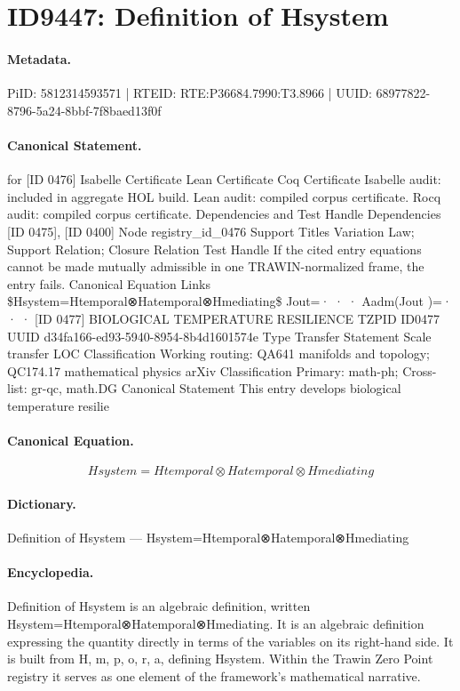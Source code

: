 \section*{ID9447: Definition of Hsystem}
\paragraph{Metadata.}
PiID: 5812314593571 | RTEID: RTE:P36684.7990:T3.8966 | UUID: 68977822-8796-5a24-8bbf-7f8baed13f0f

\paragraph{Canonical Statement.}
for [ID 0476] Isabelle Certificate Lean Certificate Coq Certificate Isabelle audit: included in aggregate HOL build. Lean audit: compiled corpus certificate. Rocq audit: compiled corpus certificate. Dependencies and Test Handle Dependencies [ID 0475], [ID 0400] Node registry\_id\_0476 Support Titles Variation Law; Support Relation; Closure Relation Test Handle If the cited entry equations cannot be made mutually admissible in one TRAWIN-normalized frame, the entry fails. Canonical Equation Links \$Hsystem=Htemporal⊗Hatemporal⊗Hmediating\$ Jout=· · · Aadm(Jout )=· · · [ID 0477] BIOLOGICAL TEMPERATURE RESILIENCE TZPID ID0477 UUID d34fa166-ed93-5940-8954-8b4d1601574e Type Transfer Statement Scale transfer LOC Classification Working routing: QA641 manifolds and topology; QC174.17 mathematical physics arXiv Classification Primary: math-ph; Cross-list: gr-qc, math.DG Canonical Statement This entry develops biological temperature resilie

\paragraph{Canonical Equation.}
\[
Hsystem=Htemporal⊗Hatemporal⊗Hmediating
\]

\paragraph{Dictionary.}
Definition of Hsystem — Hsystem=Htemporal⊗Hatemporal⊗Hmediating

\paragraph{Encyclopedia.}
Definition of Hsystem is an algebraic definition, written Hsystem=Htemporal⊗Hatemporal⊗Hmediating. It is an algebraic definition expressing the quantity directly in terms of the variables on its right-hand side. It is built from H, m, p, o, r, a, defining Hsystem. Within the Trawin Zero Point registry it serves as one element of the framework's mathematical narrative.
